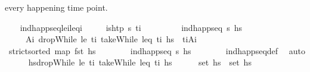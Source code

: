 \begin{isabellebody}
\begin{isamarkuptext}
  every happening time point.%
\end{isamarkuptext}\isamarkuptrue%
\ \ \isamarkupfalse%
\ ind{\isacharunderscore}{\kern0pt}happ{\isacharunderscore}{\kern0pt}seq{\isacharunderscore}{\kern0pt}le\isactrlsub i{\isacharunderscore}{\kern0pt}leq\isactrlsub i{\isacharcolon}{\kern0pt}\isanewline
\ \ \ \ \ {\isachardoublequoteopen}is{\isacharunderscore}{\kern0pt}htp\ {\isasympi}s\ t\isactrlsub i{\isachardoublequoteclose}\isanewline
\ \ \ \ \ \ \ \ \ {\isachardoublequoteopen}ind{\isacharunderscore}{\kern0pt}happ{\isacharunderscore}{\kern0pt}seq\ {\isasympi}s\ hs{\isachardoublequoteclose}\isanewline
\ \ \ \ \ {\isachardoublequoteopen}{\isasymexists}A\isactrlsub i{\isachardot}{\kern0pt}\ dropWhile\ {\isacharparenleft}{\kern0pt}le\ t\isactrlsub i{\isacharparenright}{\kern0pt}\ {\isacharparenleft}{\kern0pt}takeWhile\ {\isacharparenleft}{\kern0pt}leq\ t\isactrlsub i{\isacharparenright}{\kern0pt}\ hs{\isacharparenright}{\kern0pt}\ {\isacharequal}{\kern0pt}\ {\isacharbrackleft}{\kern0pt}{\isacharparenleft}{\kern0pt}t\isactrlsub i{\isacharcomma}{\kern0pt}A\isactrlsub i{\isacharparenright}{\kern0pt}{\isacharbrackright}{\kern0pt}{\isachardoublequoteclose}\isanewline
%
\isadelimproof
\ \ %
\endisadelimproof
%
\isatagproof
{}\isamarkupfalse%
\ {\isacharminus}{\kern0pt}\isanewline
\ \ \ \ \isamarkupfalse%
\ {\isachardoublequoteopen}strict{\isacharunderscore}{\kern0pt}sorted\ {\isacharparenleft}{\kern0pt}map\ fst\ hs{\isacharparenright}{\kern0pt}{\isachardoublequoteclose}\isanewline
\ \ \ \ \ \ \isamarkupfalse%
\ {\isacartoucheopen}ind{\isacharunderscore}{\kern0pt}happ{\isacharunderscore}{\kern0pt}seq\ {\isasympi}s\ hs{\isacartoucheclose}\isanewline
\ \ \ \ \ \ \isamarkupfalse%
\ ind{\isacharunderscore}{\kern0pt}happ{\isacharunderscore}{\kern0pt}seq{\isacharunderscore}{\kern0pt}def\ \isamarkupfalse%
\ auto\isanewline
\ \ \ \ \isamarkupfalse%
\ {\isacharquery}{\kern0pt}hs{\isacharprime}{\kern0pt}{\isacharequal}{\kern0pt}{\isachardoublequoteopen}dropWhile\ {\isacharparenleft}{\kern0pt}le\ t\isactrlsub i{\isacharparenright}{\kern0pt}\ {\isacharparenleft}{\kern0pt}takeWhile\ {\isacharparenleft}{\kern0pt}leq\ t\isactrlsub i{\isacharparenright}{\kern0pt}\ hs{\isacharparenright}{\kern0pt}{\isachardoublequoteclose}\isanewline
\ \ \ \ \isamarkupfalse%
\ {\isachardoublequoteopen}set\ {\isacharquery}{\kern0pt}hs{\isacharprime}{\kern0pt}\ {\isasymsubseteq}\ set\ hs{\isachardoublequoteclose}\isanewline

\end{isabellebody}
